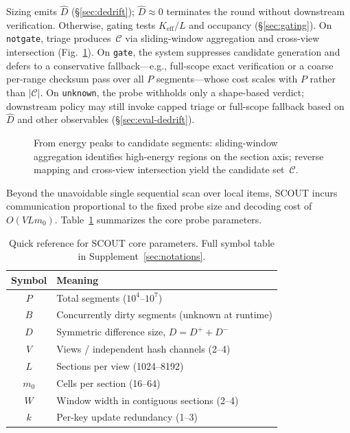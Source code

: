 Sizing emits $\hat{D}$ (\S\ref{sec:dedrift});
$\hat{D}\approx 0$ terminates the round without downstream
verification.  Otherwise, gating tests $K_{\mathrm{eff}}/L$
and occupancy (\S\ref{sec:gating}).
On \texttt{notgate}, triage produces~$\mathcal{C}$ via
sliding-window aggregation and cross-view intersection
(Fig.~\ref{fig:scout-mapping-structure-b}).
On \texttt{gate}, the system suppresses candidate generation
and defers to a conservative fallback---e.g., full-scope exact
verification or a coarse per-range checksum pass over all $P$
segments---whose cost scales with $P$ rather than
$|\mathcal{C}|$.
On \texttt{unknown}, the probe withholds only a shape-based verdict; downstream policy may still invoke capped triage or full-scope fallback
based on $\hat{D}$ and other observables (\S\ref{sec:eval-dedrift}).

\begin{figure}[!htbp]
\centering

\caption{From energy peaks to candidate segments:
sliding-window aggregation identifies high-energy regions on
the section axis; reverse mapping and cross-view intersection
yield the candidate set~$\mathcal{C}$.}
\label{fig:scout-mapping-structure-b}
\end{figure}

Beyond the unavoidable single sequential scan over local items,
SCOUT incurs communication proportional to the fixed probe
size and decoding cost of $O(VLm_0)$.
Table~\ref{tab:scout-params} summarizes the core probe
parameters.

\begin{table}[!htbp]
\caption{Quick reference for SCOUT core parameters.
Full symbol table in Supplement~\ref{sec:notations}.}
\label{tab:scout-params}
\centering
\small
\setlength{\tabcolsep}{4pt}
\begin{tabular}{@{}cl@{}}
\toprule
Symbol & Meaning \\
\midrule
$P$ & Total segments ($10^4$--$10^7$) \\
$B$ & Concurrently dirty segments (unknown at runtime) \\
$D$ & Symmetric difference size, $D=D^{+}+D^{-}$ \\
$V$ & Views / independent hash channels (2--4) \\
$L$ & Sections per view (1024--8192) \\
$m_0$ & Cells per section (16--64) \\
$W$ & Window width in contiguous sections (2--4) \\
$k$ & Per-key update redundancy (1--3) \\
\bottomrule
\end{tabular}
\end{table}


